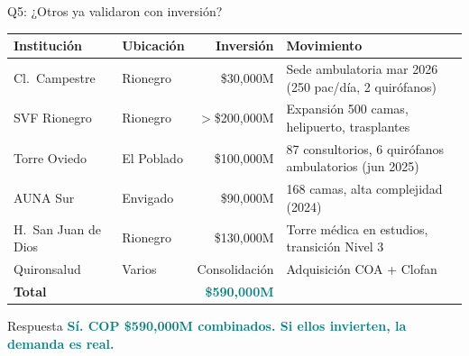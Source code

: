 \documentclass[aspectratio=169, 11pt]{beamer}
\newcommand{\highlight}[1]{\textcolor{teal}{\textbf{#1}}}
\begin{document}
\begin{frame}{Q5: ¿Otros ya validaron con inversión?}
{\scriptsize\setlength{\tabcolsep}{3pt}
\begin{tabular}{@{}p{3cm}p{2.5cm}rp{4.5cm}@{}}
\toprule
\textbf{Institución} & \textbf{Ubicación} & \textbf{Inversión} & \textbf{Movimiento} \\
\midrule
\rowcolor{coral!8}
Cl.\ Campestre & Rionegro & \$30,000M & Sede ambulatoria mar 2026 (250 pac/día, 2 quirófanos) \\
SVF Rionegro & Rionegro & $>$\$200,000M & Expansión 500 camas, helipuerto, trasplantes \\
\rowcolor{coral!8}
Torre Oviedo & El Poblado & \$100,000M & 87 consultorios, 6 quirófanos ambulatorios (jun 2025) \\
AUNA Sur & Envigado & \$90,000M & 168 camas, alta complejidad (2024) \\
\rowcolor{coral!8}
H.\ San Juan de Dios & Rionegro & \$130,000M & Torre médica en estudios, transición Nivel 3 \\
Quironsalud & Varios & Consolidación & Adquisición COA + Clofan \\
\midrule
\textbf{Total} & & \highlight{\$590,000M} & \\
\bottomrule
\end{tabular}
}

\vspace{4pt}
\begin{exampleblock}{\small Respuesta}
\centering\large
\highlight{Sí. COP \$590,000M combinados. Si ellos invierten, la demanda es real.}
\end{exampleblock}
\end{frame}
\end{document}
